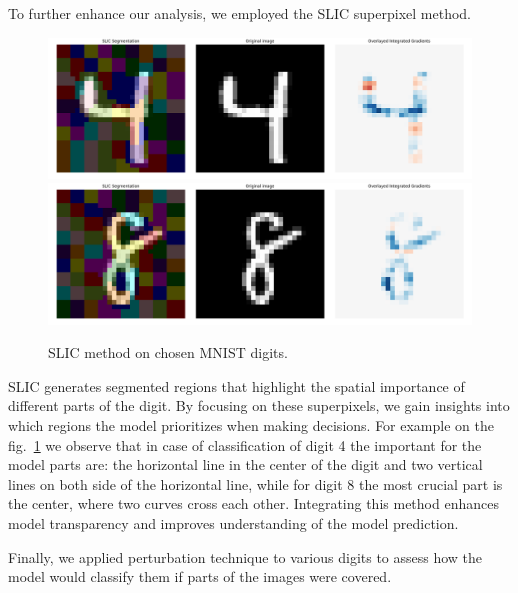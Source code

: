 \documentclass[journal, a4paper]{IEEEtran}
\begin{document}
To further enhance our analysis, we employed the SLIC superpixel method.

\begin{figure}[h]\centering
    \includegraphics[width=.6\linewidth]{img/SLIC/mnist/4}
    \includegraphics[width=.6\linewidth]{img/SLIC/mnist/8}
    \caption{SLIC method on chosen MNIST digits.}\label{fig:mnist-cnn-slic}
\end{figure}

SLIC generates segmented regions that highlight the spatial importance of different parts of the digit.
By focusing on these superpixels, we gain insights into which regions the model prioritizes when making decisions.
For example on the fig.~\ref{fig:mnist-cnn-slic} we observe that in case of classification of digit 4 the important for the model parts are: the horizontal line in the center of the digit and two vertical lines on both side of the horizontal line, while for digit 8 the most crucial part is the center, where two curves cross each other.
Integrating this method enhances model transparency and improves understanding of the model prediction.

Finally, we applied perturbation technique to various digits to assess how the model would classify them if parts of the images were covered.
\end{document}
